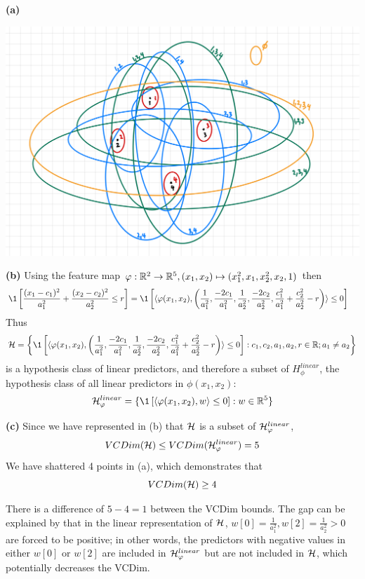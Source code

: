 \documentclass[a4paper, 12pt]{article}
\begin{document}
\begin{problem} [Problem 3]
\textbf{(a)}
\begin{center}
    \includegraphics[width=15cm]{./figures/3.3a.jpeg}
\end{center}

\textbf{(b)}
Using the feature map $\varphi: \mathbb{R}^2 \to \mathbb{R}^5, (x_1, x_2) \mapsto (x_1^2, x_1, x_2^2, x_2, 1)$ then
\begin{align*}
   \1\left[\frac{(x_1 - c_1)^2}{a_1^2} + \frac{(x_2 - c_2)^2}{a_2^2} \leq r\right]&= \1\left[\iprod{\phi(x_1, x_2)}{\left(\frac{1}{a_1^2}, \frac{-2c_1}{a_1^2}, \frac{1}{a_2^2}, \frac{-2c_2}{a_2^2}, \frac{c_1^2}{a_1^2} + \frac{c_2^2}{a_2^2} - r\right)} \leq 0\right]
\end{align*}
Thus \begin{equation*}
\calh = \left\{\1\left[\iprod{\phi(x_1, x_2)}{\left(\frac{1}{a_1^2}, \frac{-2c_1}{a_1^2}, \frac{1}{a_2^2}, \frac{-2c_2}{a_2^2}, \frac{c_1^2}{a_1^2} + \frac{c_2^2}{a_2^2} - r\right)} \leq 0\right] : c_1, c_2, a_1, a_2, r \in \bbr; a_1 \neq a_2\right\}
\end{equation*}
is a hypothesis class of linear predictors, and therefore a subset of $H^{linear}_\phi$, the hypothesis class of all linear predictors in $\phi(x_1, x_2)$:
\begin{equation*}
\calh^{linear}_\phi = \{\1 \left[\iprod{\phi(x_1, x_2)}{w} \leq 0\right] : w \in \bbr^5\}
\end{equation*}

\textbf{(c)} Since we have represented in (b) that $\mathcal{H}$ is a subset of $\mathcal{H}^{linear}_\varphi$, \begin{equation*}
VCDim(\mathcal{H}) \leq VCDim(\mathcal{H}^{linear}_\varphi) = 5
\end{equation*}
We have shattered 4 points in (a), which demonstrates that \begin{equation*}
VCDim(\mathcal{H}) \geq 4
\end{equation*}

There is a difference of $5 - 4 = 1$ between the VCDim bounds. The gap can be explained by that in the linear representation of $\mathcal{H}$, $w[0] = \frac{1}{a_1^2}, w[2] = \frac{1}{a_2^2} > 0$ are forced to be positive; in other words, the predictors with negative values in either $w[0]$ or $w[2]$ are included in $\mathcal{H}^{linear}_\varphi$ but are not included in $\mathcal{H}$, which potentially decreases the VCDim.
\end{problem}
\end{document}
